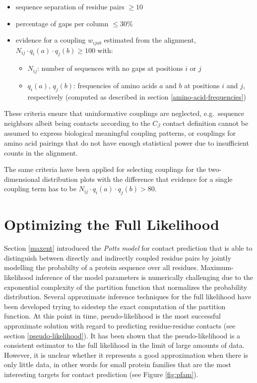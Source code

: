 \documentclass[11pt,a4paper,twoside]{book}
\providecommand{\tightlist}{%
  \setlength{\itemsep}{0pt}\setlength{\parskip}{0pt}}
\newcommand{\Cb}{C_\beta}
\newcommand{\wijab}{w_{ijab}}
\theoremstyle{definition}
\theoremstyle{definition}
\theoremstyle{remark}
\begin{document}
\begin{itemize}
\tightlist
\item
  sequence separation of residue pairs \(\ge 10\)
\item
  percentage of gaps per column \(\le 30\%\)
\item
  evidence for a coupling \(\wijab\) estimated from the alignment,
  \(N_{ij} \cdot q_i(a) \cdot q_j(b) \ge 100\) with:

  \begin{itemize}
  \tightlist
  \item
    \(N_{ij}\): number of sequences with no gaps at positions \(i\) or
    \(j\)
  \item
    \(q_i(a)\), \(q_j(b)\): frequencies of amino acids \(a\) and \(b\)
    at positions \(i\) and \(j\), respectively (computed as described in
    section \ref{amino-acid-frequencies})
  \end{itemize}
\end{itemize}

These criteria ensure that uninformative couplings are neglected,
e.g.~sequence neighbors albeit being contacts according to the \(\Cb\)
contact definition cannot be assumed to express biological meaningful
coupling patterns, or couplings for amino acid pairings that do not have
enough statistical power due to insufficient counts in the alignment.

The same criteria have been applied for selecting couplings for the
two-dimensional distribution plots with the difference that evidence for
a single coupling term has to be
\(N_{ij} \cdot q_i(a) \cdot q_j(b) > 80.\)

\chapter{Optimizing the Full
Likelihood}\label{optimizing-full-likelihood}

Section \ref{maxent} introduced the \emph{Potts model} for contact
prediction that is able to distinguish between directly and indirectly
coupled residue pairs by jointly modelling the probabilty of a protein
sequence over all residues. Maximum-likelihood inference of the model
parameters is numerically challenging due to the exponential complexity
of the partition function that normalizes the probability distribution.
Several approximate inference techniques for the full likelihood have
been developed trying to sidestep the exact computation of the partition
function. At this point in time, pseudo-likelihood is the most
successful approximate solution with regard to predicting
residue-residue contacts (see section \ref{pseudo-likelihood}). It has
been shown that the pseudo-likelihood is a consistent estimator to the
full likelihood in the limit of large amounts of data. However, it is
unclear whether it represents a good approximation when there is only
little data, in other words for small protein families that are the most
interesting targets for contact prediction (see Figure \ref{fig:pfam}).
\end{document}
